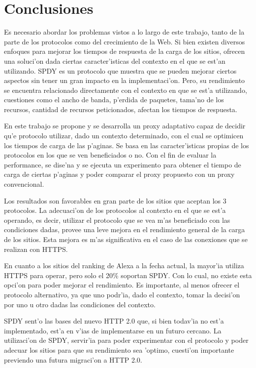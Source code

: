 \chapter{Conclusiones}

Es necesario abordar los problemas vistos a lo largo de este trabajo, tanto de la parte de los protocolos como del crecimiento de la Web. Si bien existen diversos enfoques para mejorar los tiempos de respuesta de la carga de los sitios, ofrecen una soluci'on dada ciertas caracter'isticas del contexto en el que se est'an utilizando. SPDY es un protocolo que muestra que se pueden mejorar ciertos aspectos sin tener un gran impacto en la implementaci'on. Pero, su rendimiento se encuentra relacionado directamente con el contexto en que se est'a utilizando, cuestiones como el ancho de banda, p'erdida de paquetes, tama'no de los recursos, cantidad de recursos peticionados, afectan los tiempos de respuesta.

En este trabajo se propone y se desarrolla un proxy adaptativo capaz de decidir qu'e protocolo utilizar, dado un contexto determinado, con el cual se optimicen los tiempos de carga de las p'aginas. Se basa en las caracter'isticas propias de los protocolos en los que se ven beneficiados o no. Con el fin de evaluar la performance, se dise'na y se ejecuta un experimento para obtener el tiempo de carga de ciertas p'aginas y poder comparar el proxy propuesto con un proxy convencional.

Los resultados son favorables en gran parte de los sitios que aceptan los 3 protocolos. La adecuaci'on de los protocolos al contexto en el que se est'a operando, es decir, utilizar el protocolo que se vea m'as beneficiado con las condiciones dadas, provee una leve mejora en el rendimiento general de la carga de los sitios. Esta mejora es m'as significativa en el caso de las conexiones que se realizan con HTTPS.

En cuanto a los sitios del ranking de Alexa a la fecha actual, la mayor'ia utiliza HTTPS para operar, pero solo el 20\% soportan SPDY. Con lo cual, no existe esta opci'on para poder mejorar el rendimiento. Es importante, al menos ofrecer el protocolo alternativo, ya que uno podr'ia, dado el contexto, tomar la decisi'on por uno u otro dadas las condiciones del contexto.

SPDY sent'o las bases del nuevo HTTP 2.0 que, si bien todav'ia no est'a implementado, est'a en v'ias de implementarse en un futuro cercano. La utilizaci'on de SPDY, servir'ia para poder experimentar con el protocolo y poder adecuar los sitios para que su rendimiento sea 'optimo, cuesti'on importante previendo una futura migraci'on a HTTP 2.0.

